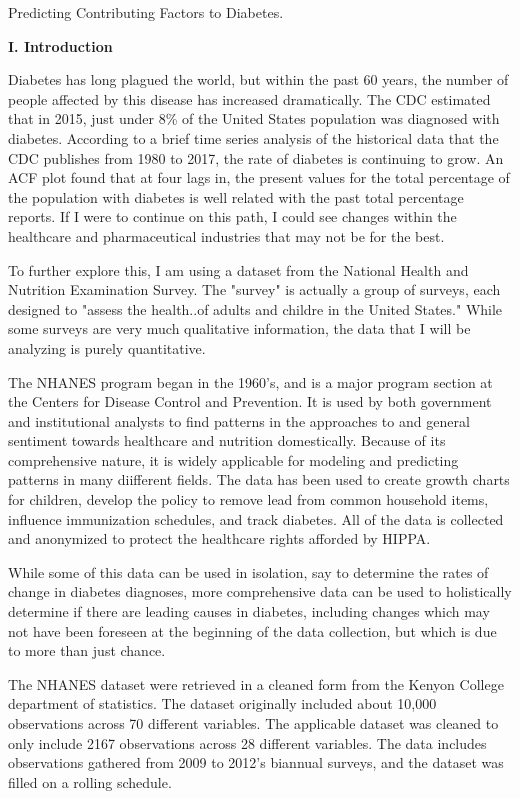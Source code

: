 \documentclass[letter,12pt]{article}
\begin{document}
	\begin{center}
		Predicting Contributing Factors to Diabetes.
	\end{center}
	\begin{center}
		\textbf{I. Introduction}
	\end{center}
	\justify
	\indent Diabetes has long plagued the world, but within the past 60 years, the number of people affected by this disease has increased dramatically. The CDC estimated that in 2015, just under 8\% of the United States population was diagnosed with diabetes. According to a brief time series analysis of the historical data that the CDC publishes from 1980 to 2017, the rate of diabetes is continuing to grow. An ACF plot found that at four lags in, the present values for the total percentage of the population with diabetes is well related with the past total percentage reports. If I were to continue on this path, I could see changes within the healthcare and pharmaceutical industries that may not be for the best.\par
	To further explore this, I am using a dataset from the National Health and Nutrition Examination Survey. The "survey" is actually a group of surveys, each designed to "assess the health..of adults and childre in the United States." While some surveys are very much qualitative information, the data that I will be analyzing is purely quantitative.\par
	The NHANES program began in the 1960's, and is a major program section at the Centers for Disease Control and Prevention. It is used by both government and institutional analysts to find patterns in the approaches to and general sentiment towards healthcare and nutrition domestically. Because of its comprehensive nature, it is widely applicable for modeling and predicting patterns in many diifferent fields. The data has been used to create growth charts for children, develop the policy to remove lead from common household items, influence immunization schedules, and track diabetes. All of the data is collected and anonymized to protect the healthcare rights afforded by HIPPA. \par
	While some of this data can be used in isolation, say to determine the rates of change in diabetes diagnoses, more comprehensive data can be used to holistically determine if there are leading causes in diabetes, including changes which may not have been foreseen at the beginning of the data collection, but which is due to more than just chance.\par
	The NHANES dataset were retrieved in a cleaned form from the Kenyon College department of statistics. The dataset originally included about 10,000 observations across 70 different variables. The applicable dataset was cleaned to only include 2167 observations across 28 different variables. The data includes observations gathered from 2009 to 2012's biannual surveys, and the dataset was filled on a rolling schedule.\par
	
\end{document}
